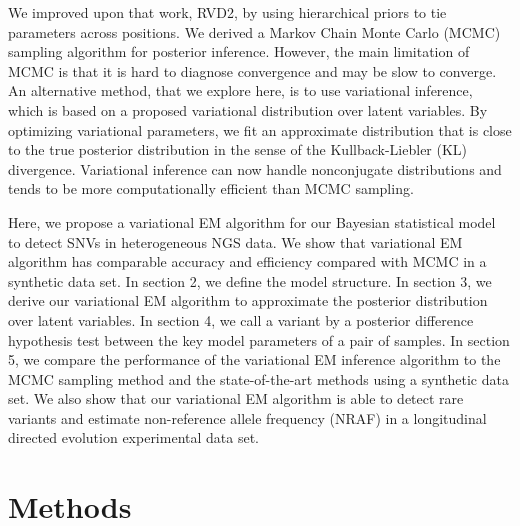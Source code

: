 \documentclass{bmcart}
\begin{document}
We improved upon that work, RVD2, by using hierarchical priors to tie parameters across positions\cite{he2015rvd2}.
We derived a Markov Chain Monte Carlo (MCMC) sampling algorithm for posterior inference.
However, the main limitation of MCMC is that it is hard to diagnose convergence and may be slow to converge\cite{jordan1999introduction}.
An alternative method, that we explore here, is to use variational inference, which is based on a proposed variational distribution over latent variables.
By optimizing variational parameters, we fit an approximate distribution that is close to the true posterior distribution in the sense of the Kullback-Liebler (KL) divergence.
Variational inference can now handle nonconjugate distributions and tends to be more computationally efficient than MCMC sampling\cite{peterson1989explorations}.

Here, we propose a variational EM algorithm for our Bayesian statistical model to detect SNVs in heterogeneous NGS data.
We show that variational EM algorithm has comparable accuracy and efficiency compared with MCMC in a synthetic data set.
In section 2, we define the model structure.
In section 3, we derive our variational EM algorithm to approximate the posterior distribution over latent variables.
In section 4, we call a variant by a posterior difference hypothesis test between the key model parameters of a pair of samples.
In section 5, we compare the performance of the variational EM inference algorithm to the MCMC sampling method and the state-of-the-art methods using a synthetic data set.
We also show that our variational EM algorithm is able to detect rare variants and estimate non-reference allele frequency (NRAF) in a longitudinal directed evolution experimental data set.

\section{Methods}
\end{document}
